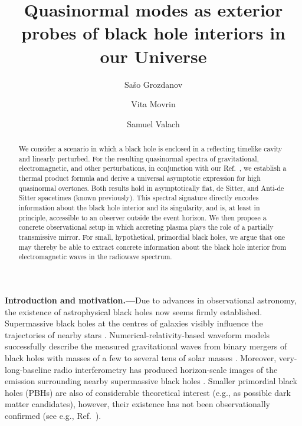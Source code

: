 \documentclass[prd,aps,twocolumn,amsfonts,showpacs,superscriptaddress,preprintnumbers,nofootinbib]{revtex4-2}
\begin{document}

\title{Quasinormal modes as exterior probes of black hole interiors in our Universe}

\author{Sa\v{s}o Grozdanov}

\author{Vita Movrin}

\author{Samuel Valach}

\begin{abstract}
We consider a scenario in which a black hole is enclosed in a reflecting timelike cavity and linearly perturbed. For the resulting quasinormal spectra of gravitational, electromagnetic, and other perturbations, in conjunction with our Ref.~\cite{Grozdanov:2026ktq}, we establish a thermal product formula and derive a universal asymptotic expression for high quasinormal overtones. Both results hold in asymptotically flat, de Sitter, and Anti-de Sitter spacetimes (known previously). This spectral signature directly encodes information about the black hole interior and its singularity, and is, at least in principle, accessible to an observer outside the event horizon. We then propose a concrete observational setup in which accreting plasma plays the role of a partially transmissive mirror. For small, hypothetical, primordial black holes, we argue that one may thereby be able to extract concrete information about the black hole interior from electromagnetic waves in the radiowave spectrum.
\end{abstract}

\maketitle


{\bf Introduction and motivation.---}Due to advances in observational astronomy, the existence of astrophysical black holes now seems firmly established. Supermassive black holes at the centres of galaxies visibly influence the trajectories of nearby stars \cite{Schodel:2002vg,Ghez:2008ms}. Numerical-relativity-based waveform models successfully describe the measured gravitational waves from binary mergers of black holes with masses of a few to several tens of solar masses \cite{LIGOScientific:2016aoc}. Moreover, very-long-baseline radio interferometry has produced horizon-scale images of the emission surrounding nearby supermassive black holes \cite{EventHorizonTelescope:2019dse}. Smaller primordial black holes (PBHs) are also of considerable theoretical interest (e.g., as possible dark matter candidates), however, their existence has not been observationally confirmed (see e.g., Ref.~\cite{Carr:2021bzv}).
\end{document}

